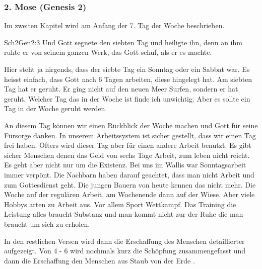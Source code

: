 \subsubsection{2. Mose (Genesis 2)}
Im zweiten Kapitel wird am Anfang der 7. Tag der Woche beschrieben. 
\begin{bibeltext}{Sch2}{Gen}{2:3}
    Und Gott segnete den siebten Tag und heiligte ihn, denn an ihm ruhte er von seinem ganzen Werk, das Gott schuf, als er es machte.
\end{bibeltext}
Hier steht ja nirgends, dass der siebte Tag ein Sonntag oder ein Sabbat war. Es heisst einfach, dass Gott nach 6 Tagen arbeiten, diese hingelegt hat. Am siebten Tag hat er geruht. Er ging nicht auf den neuen Meer Surfen, sondern er hat geruht. Welcher Tag das in der Woche ist finde ich unwichtig. Aber es sollte ein Tag in der Woche geruht werden.

An diesem Tag können wir einen Rückblick der Woche machen und Gott für seine Fürsorge danken. In unserem Arbeitssystem ist sicher gestellt, dass wir einen Tag frei haben. Öfters wird dieser Tag aber für einen andere Arbeit benutzt. Es gibt sicher Menschen denen das Geld von sechs Tage Arbeit, zum leben nicht reicht. Es geht aber nicht nur um die Existenz. Bei uns im Wallis war Sonntagsarbeit immer verpönt. Die Nachbarn haben darauf geachtet, dass man nicht Arbeit und zum Gottesdienst geht. Die jungen Bauern von heute kennen das nicht mehr. Die Woche auf der regulären Arbeit, am Wochenende dann auf der Wiese. Aber viele Hobbys arten zu Arbeit aus. Vor allem Sport Wettkampf. Das Training die Leistung alles braucht Substanz und man kommt nicht zur der Ruhe die man braucht um sich zu erholen.

In den restlichen Versen wird dann die Erschaffung des Menschen detaillierter aufgezeigt. Von 4 - 6 wird nochmals kurz die Schöpfung zusammengefasst und dann die Erschaffung den Menschen aus \flqq Staub von der Erde \frqq{}. 

